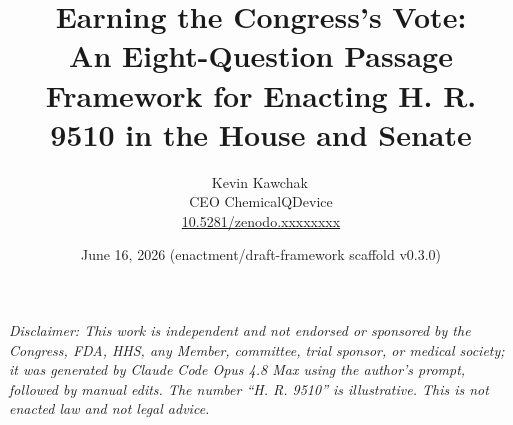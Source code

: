 \documentclass[11pt]{article}
\title{Earning the Congress's Vote:\\An Eight-Question Passage Framework for Enacting H. R. 9510 in the House and Senate}
\author{Kevin Kawchak\,\orcidicon{0009-0007-5457-8667}\\ CEO ChemicalQDevice\\ \href{https://doi.org/10.5281/zenodo.xxxxxxxx}{10.5281/zenodo.xxxxxxxx}}
\date{June 16, 2026 (enactment/draft-framework scaffold v0.3.0)}
\begin{document}
\maketitle
\thispagestyle{empty}

\begin{abstract}

\end{abstract}

\vspace{0.2em}\noindent\footnotesize\textit{Disclaimer: This work is independent and
not endorsed or sponsored by the Congress, FDA, HHS, any Member, committee, trial
sponsor, or medical society; it was generated by Claude Code Opus 4.8 Max using the
author's prompt, followed by manual edits. The number ``H. R. 9510'' is
illustrative. This is not enacted law and not legal advice.}\normalsize\par




\tableofcontents
\vspace{0.3cm}










\clearpage


\clearpage
{}
\begingroup\raggedright\nocite{*}\endgroup


\end{document}
